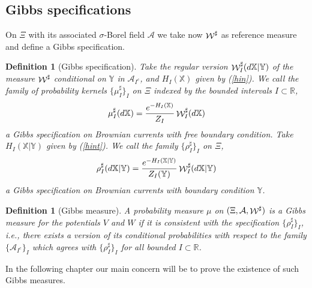 \documentclass[a4paper,11pt]{article}
\newtheorem{definition}[theorem]{Definition}
\newcommand{\R}{\mathbb{R}}
\newcommand {\A}  {\ensuremath {\mathcal{A}}}
\newcommand{\W}{\mathop{\mathrm{{\cal W}}}\nolimits}
\begin{document}
\subsection{Gibbs specifications}


On $\Xi$ with its associated $\sigma$-Borel field $\A$ we take now 
$\W^\sharp$ as reference measure and define a Gibbs specification.
\begin{definition}[Gibbs specification]
Take the regular version $\W_I^\sharp(d\mathbb{X}|\mathbb{Y})$ of 
the measure $\W^\sharp$ conditional on $\mathbb{Y}$ in $\A_{I^c}$, 
and $H_I(\mathbb{X})$ given by (\ref{hin}). We call the family of
probability kernels $\{\mu^\sharp_I\}_I$ on $\Xi$ indexed by the 
bounded intervals $I \subset \R$, 
\begin{equation}
\label{eq:curr-finite-vol}
\mu^\sharp_I(d\mathbb{X}) = \frac{e^{-H_I(\mathbb{X})}}
{Z_I} \W^\sharp_I(d\mathbb{X})  
\end{equation}
a \emph{Gibbs specification on Brownian currents with free 
boundary condition}. Take $H_I(\mathbb{X}|\mathbb{Y})$ given 
by (\ref{hint}). We call the family $\{\rho^\sharp_I\}_I$ on
$\Xi$,
\begin{equation}
\label{eq:spec}
\rho^\sharp_I(d\mathbb{X}|\mathbb{Y}) = 
\frac{e^{-H_I(\mathbb{X}|\mathbb{Y})}}{Z_I(\mathbb{Y})} 
\W^\sharp_I(d\mathbb{X} | \mathbb{Y})  
\end{equation}
a \emph{Gibbs specification on Brownian currents with boundary
condition $\mathbb{Y}$}. 
\end{definition}

\begin{definition}[Gibbs measure]
A probability measure $\mu$ on $(\Xi,\A,\W^\sharp)$ is a 
\emph{Gibbs measure} for the potentials $V$ and $W$ if it is 
consistent with the specification $\{\rho^\sharp_I\}_I$, i.e.,
there exists a version of its conditional probabilities with
respect to the family $\{\A_{I^c}\}_I$ which agrees with 
$\{\rho^\sharp_I\}_I$ for all bounded $I \subset \R$. 
\end{definition}
In the following chapter our main concern will be to prove the
existence of such Gibbs measures. 
\end{document}
